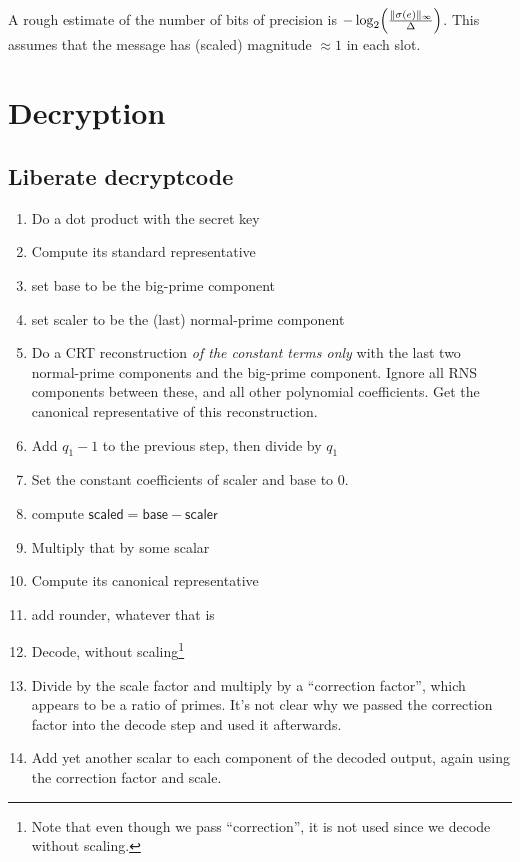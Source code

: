 \documentclass[../fheimpl.tex]{subfiles}
\begin{document}
A rough estimate of the number of bits of precision is $-\log_2\parens*{\frac{\length{\sigma(e)}_\infty}{\Delta}}$. This assumes that the message has (scaled) magnitude $\approx 1$ in each slot.

\section{Decryption}
    \subsection{Liberate \textsf{decryptcode}}

    \begin{enumerate}
        \item Do a dot product with the secret key
        \item Compute its standard representative
        \item set \textsf{base} to be the big-prime component
        \item set \textsf{scaler} to be the (last) normal-prime component
        \item Do a CRT reconstruction \emph{of the constant terms only} with the last two normal-prime components and the big-prime component. Ignore all RNS components between these, and all other polynomial coefficients. Get the canonical representative of this reconstruction.
        \item Add $q_1-1$ to the previous step, then divide by $q_1$
        \item Set the constant coefficients of \textsf{scaler} and \textsf{base} to 0.
        \item compute $\mathsf{scaled}=\mathsf{base}-\mathsf{scaler}$
        \item Multiply that by some scalar
        \item Compute its canonical representative
        \item add \textsf{rounder}, whatever that is
        \item Decode, without scaling\footnote{Note that even though we pass ``correction'', it is not used since we decode without scaling.} 
        \item Divide by the scale factor and multiply by a ``correction factor'', which appears to be a ratio of primes. It's not clear why we passed the correction factor into the decode step and used it afterwards.
        \item Add yet another scalar to each component of the decoded output, again using the correction factor and scale.
    \end{enumerate}
\end{document}
